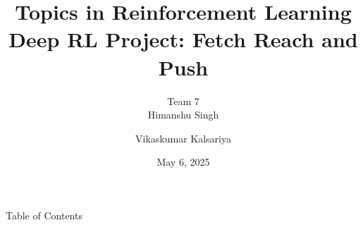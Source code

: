 \documentclass[9pt, aspectratio=169]{slides}
\title{{\normalsize Topics in Reinforcement Learning} \\ \vspace{0.5em} Deep RL Project: Fetch Reach and Push}
\author{Team 7 \\ \vspace{0.5em} Himanshu Singh \and Vikaskumar Kalsariya}
\date{May 6, 2025}
\begin{document}
\begin{frame}
    \titlepage
\end{frame}

\begin{frame}{Table of Contents}
    \tableofcontents
\end{frame}





\end{document}
